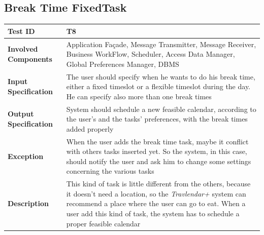 \subsection*{Break Time FixedTask}

\begin{table}[H]
    \centering
    \begin{tabular}{p{4.55cm} p{7cm}}
        
        \hline
        
        \textbf{Test ID}                & T8 \\
        
        \hline
        
        \textbf{Involved Components}    & Application Façade, Message Transmitter, Message Receiver, Business                                          WorkFlow, Scheduler, Access Data Manager, Global Preferences Manager,                                      DBMS\\
        
        \hline
        
        \textbf{Input Specification}    & The user should specify when he wants to do his break time, either a fixed timeslot or a flexible timeslot during the day. He can specify also more than one break times\\
        
        \hline
        
        \textbf{Output Specification}   & System should schedule a new feasible calendar, according to the user's and the tasks' preferences, with the break times added properly\\
        
        \hline
        
        \textbf{Exception}              & When the user adds the break time task, maybe it conflict with others tasks inserted yet. So the system, in this case, should notify the user and ask him to change some settings concerning the various tasks\\
        
        \hline
        
        \textbf{Description}            & This kind of task is little different from the others, because it doesn't need a location, so the \emph{Travlendar+} system can recommend a place where the user can go to eat. When a user add this kind of task, the system has to schedule a proper feasible calendar\\
        \hline
        

\end{tabular}
\end{table}
